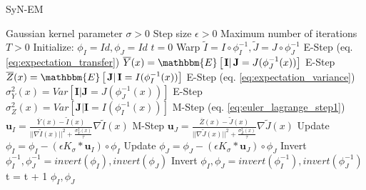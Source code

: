 \begin{algorithm}[h!]
\caption{SyN-EM}\label{alg:SyNEM}
\begin{algorithmic}[1]
\REQUIRE Gaussian kernel parameter $\sigma>0$
\REQUIRE Step size $\epsilon>0$
\REQUIRE Maximum number of iterations $T>0$
\STATE Initialize: $\phi_{I} = Id, \phi_{J} = Id$
\STATE $t=0$
\REPEAT
    \STATE Warp $\tilde{I}  = I \circ \phi_{I}^{-1}, \tilde{J} = J \circ \phi_{J}^{-1}$
    \STATE E-Step (eq. \eqref{eq:expectation_transfer}) $\overline{Y}(x) = \mathbbm{E}\left[\left.\mathbf{I}\right| \mathbf{J}= J(\phi_{J}^{-1}(x))\right]$
    \STATE E-Step $\overline{Z}(x) = \mathbbm{E}\left[\left.\mathbf{J}\right| \mathbf{I}= I(\phi_{I}^{-1}(x))\right]$
    \STATE E-Step (eq. \eqref{eq:expectation_variance}) $\sigma^{2}_{Y}(x) = Var\left[\left.\mathbf{I}\right| \mathbf{J}= J(\phi_{J}^{-1}(x))\right]$
    \STATE E-Step $\sigma^{2}_{Z}(x) = Var\left[\left.\mathbf{J}\right| \mathbf{I}= I(\phi_{I}^{-1}(x))\right]$
    \STATE M-Step (eq. \eqref{eq:euler_lagrange_step1}) $\mathbf{u}_{I} = \frac{\overline{Y}(x) - \tilde{I}(x)}{||\nabla \tilde{I}(x)||^{2} + \frac{\sigma_{Y}^{2}(x)}{\tau}}\nabla \tilde{I}(x)$
    \STATE M-Step $\mathbf{u}_{J} = \frac{\overline{Z}(x) - \tilde{J}(x)}{||\nabla \tilde{J}(x)||^{2} + \frac{\sigma_{Z}^{2}(x)}{\tau}}\nabla \tilde{J}(x)$
    \STATE Update $\phi_{I} = \phi_{I} - \left(\epsilon K_{\sigma} \ast \mathbf{u}_{I} \right)\circ \phi_{I}$
    \STATE Update $\phi_{J} = \phi_{J} - \left(\epsilon K_{\sigma} \ast \mathbf{u}_{J} \right)\circ \phi_{J}$
    \STATE Invert $\phi_{I}^{-1}, \phi_{J}^{-1} = invert(\phi_{I}), invert(\phi_{J})$
    \STATE Invert $\phi_{I}, \phi_{J} = invert(\phi_{I}^{-1}), invert(\phi_{J}^{-1})$
    \STATE t = t + 1
\RETURN $\phi_{I}, \phi_{J}$
\end{algorithmic}
\end{algorithm}



